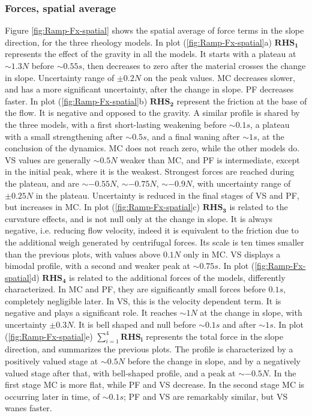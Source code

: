 \documentclass{article}
\begin{document}
\subsubsection{Forces, spatial average}
Figure \ref{fig:Ramp-Fx-spatial} shows the spatial average of force terms in the slope direction, for the three rheology models. In plot (\ref{fig:Ramp-Fx-spatial}a) $\boldsymbol{RHS_1}$ represents the effect of the gravity in all the models. It starts with a plateau at $\sim 1.3 N$ before $\sim 0.55 s$, then decreases to zero after the material crosses the change in slope. Uncertainty range of $\pm 0.2 N$ on the peak values. MC decreases slower, and has a more significant uncertainty, after the change in slope. PF decreases faster. In plot (\ref{fig:Ramp-Fx-spatial}b) $\boldsymbol{RHS_2}$ represent the friction at the base of the flow. It is negative and opposed to the gravity. A similar profile is shared by the three models, with a first short-lasting weakening before $\sim 0.1 s$, a plateau with a small strengthening after $\sim 0.5 s$, and a final waning after $\sim 1 s$, at the conclusion of the dynamics. MC does not reach zero, while the other models do. VS values are generally $\sim 0.5 N$ weaker than MC, and PF is intermediate, except in the initial peak, where it is the weakest. Strongest forces are reached during the plateau, and are $\sim -0.55 N$, $\sim -0.75 N$, $\sim -0.9 N$, with uncertainty range of $\pm 0.25 N$ in the plateau. Uncertainty is reduced in the final stages of VS and PF, but increases in MC. In plot (\ref{fig:Ramp-Fx-spatial}c) $\boldsymbol{RHS_3}$ is related to the curvature effects, and is not null only at the change in slope. It is always negative, i.e. reducing flow velocity, indeed it is equivalent to the friction due to the additional weigh generated by centrifugal forces. Its scale is ten times smaller than the previous plots, with values above $0.1 N$ only in MC. VS displays a bimodal profile, with a second and weaker peak at $\sim 0.75 s$. In plot (\ref{fig:Ramp-Fx-spatial}d) $\boldsymbol{RHS_4}$ is related to the additional forces of the models, differently characterized. In MC and PF, they are significantly small forces before $0.1 s$, completely negligible later. In VS, this is the velocity dependent term. It is negative and plays a significant role. It reaches $\sim 1 N$ at the change in slope, with uncertainty $\pm 0.3 N$. It is bell shaped and null before $\sim 0.1 s$ and after $\sim 1 s$. In plot (\ref{fig:Ramp-Fx-spatial}e) $\sum^4_{i=1}\boldsymbol{RHS_i}$ represents the total force in the slope direction, and summarizes the previous plots. The profile is characterized by a positively valued stage at $\sim 0.5 N$ before the change in slope, and by a negatively valued stage after that, with bell-shaped profile, and a peak at $\sim -0.5 N$. In the first stage MC is more flat, while PF and VS decrease. In the second stage MC is occurring later in time, of $\sim 0.1 s$; PF and VS are remarkably similar, but VS wanes faster.
\end{document}
